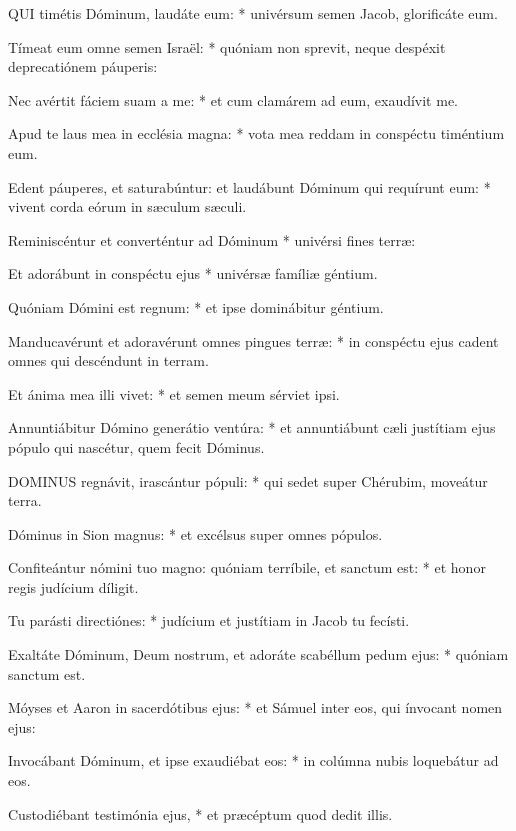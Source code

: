 
\lettrine[lines=2]{Q}{UI} timétis Dóminum, laudáte eum: * univérsum semen Jacob, glorificáte eum.

Tímeat eum omne semen Israël: * quóniam non sprevit, neque despéxit deprecatiónem páuperis:

Nec avértit fáciem suam a me: * et cum clamárem ad eum, exaudívit me.

Apud te laus mea in ecclésia magna: * vota mea reddam in conspéctu timéntium eum.

Edent páuperes, et saturabúntur: et laudábunt Dóminum qui requírunt eum: * vivent corda eórum in sæculum sæculi.

Reminiscéntur et converténtur ad Dóminum * univérsi fines terræ:

Et adorábunt in conspéctu ejus * univérsæ famíliæ géntium.

Quóniam Dómini est regnum: * et ipse dominábitur géntium.

Manducavérunt et adoravérunt omnes pingues terræ: * in conspéctu ejus cadent omnes qui descéndunt in terram.

Et ánima mea illi vivet: * et semen meum sérviet ipsi.

Annuntiábitur Dómino generátio ventúra: * et annuntiábunt cæli justítiam ejus pópulo qui nascétur, quem fecit Dóminus.



\lettrine[lines=2]{D}{OMINUS} regnávit, irascántur pópuli: * qui sedet super Chérubim, moveátur terra.

Dóminus in Sion magnus: * et excélsus super omnes pópulos.

Confiteántur nómini tuo magno: quóniam terríbile, et sanctum est: * et honor regis judícium díligit.

Tu parásti directiónes: * judícium et justítiam in Jacob tu fecísti.

Exaltáte Dóminum, Deum nostrum, et adoráte scabéllum pedum ejus: * quóniam sanctum est.

Móyses et Aaron in sacerdótibus ejus: * et Sámuel inter eos, qui ínvocant nomen ejus:

Invocábant Dóminum, et ipse exaudiébat eos: * in colúmna nubis loquebátur ad eos.

Custodiébant testimónia ejus, * et præcéptum quod dedit illis.

